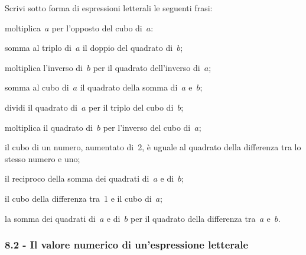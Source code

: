 \begin{multicols}{2}
\begin{esercizio}
\label{ese:8.12}
Scrivi sotto forma di espressioni letterali le seguenti frasi:
 \begin{enumeratea}
 \item moltiplica~$a$ per l'opposto del cubo di~$a$:
 \item somma al triplo di~$a$ il doppio del quadrato di~$b$;
 \item moltiplica l'inverso di~$b$ per il quadrato dell'inverso di~$a$;
 \item somma al cubo di~$a$ il quadrato della somma di~$a$ e~$b$;
 \item dividi il quadrato di~$a$ per il triplo del cubo di~$b$;
 \item moltiplica il quadrato di~$b$ per l'inverso del cubo di~$a$;
 \item il cubo di un numero, aumentato di~2, è uguale al quadrato della differenza tra lo stesso numero e uno;
 \item il reciproco della somma dei quadrati di~$a$ e di~$b$;
 \item il cubo della differenza tra~1 e il cubo di~$a$;
 \item la somma dei quadrati di~$a$ e di~$b$ per il quadrato della differenza tra~$a$ e~$b$.
 \end{enumeratea}
\end{esercizio}
\end{multicols}
\subsubsection*{8.2 - Il valore numerico di un'espressione letterale}

